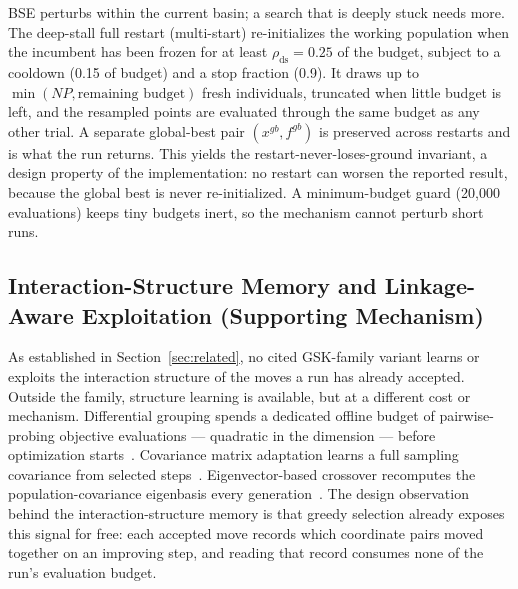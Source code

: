 BSE perturbs within the current basin; a search that is deeply stuck
needs more.
The deep-stall full restart (multi-start) re-initializes the working
population when the incumbent has been frozen for at least
$\rho_{\text{ds}}=0.25$ of the budget, subject to a cooldown
(0.15 of budget) and a stop fraction (0.9). It draws up to
$\min(NP, \text{remaining budget})$ fresh individuals, truncated when little
budget is left, and the resampled points are evaluated through the same budget
as any other trial. A separate
global-best pair $(x^{gb},f^{gb})$ is preserved across restarts and is what
the run returns. %
This yields the restart-never-loses-ground invariant, a design
property of the implementation: no restart can worsen the reported
result, because the global best is never re-initialized.
A minimum-budget guard (20{,}000 evaluations) keeps tiny budgets
inert, so the mechanism cannot perturb short
runs. %

\subsection{Interaction-Structure Memory and Linkage-Aware Exploitation (Supporting Mechanism)}\label{sec:alg:ism}



As established in Section~\ref{sec:related}, no cited GSK-family variant
learns or exploits the interaction structure of the moves a run has
already accepted.
Outside the family, structure learning is available, but at a different
cost or mechanism. Differential grouping spends a dedicated offline
budget of pairwise-probing objective evaluations --- quadratic in the
dimension --- before optimization starts~\cite{omidvar2014dg}. Covariance
matrix adaptation learns a full sampling covariance from selected
steps~\cite{hansen2001cmaes}. Eigenvector-based crossover
recomputes the population-covariance eigenbasis every
generation~\cite{guo2015eig}. %
The design observation behind the interaction-structure memory is that greedy
selection already exposes this signal for free: each accepted move
records which coordinate pairs moved together on an improving step, and
reading that record consumes none of the run's evaluation budget.

